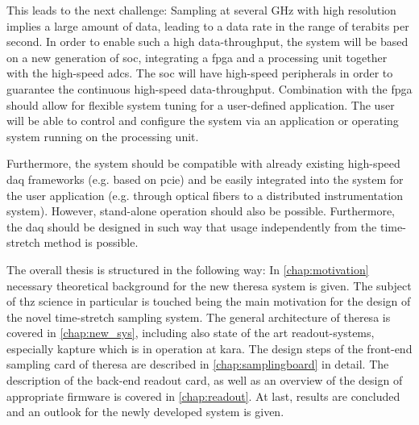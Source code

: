This leads to the next challenge: Sampling at several \si{\GHz} with high resolution implies a large amount of data, leading to a data rate in the range of terabits per second.
In order to enable such a high data-throughput, the system will be based on a new generation of \gls{soc}, integrating a \gls{fpga} and a processing unit together with the high-speed \glspl{adc}. 
The \gls{soc} will have high-speed peripherals in order to guarantee the continuous high-speed data-throughput. 
Combination with the \gls{fpga} should allow for flexible system tuning for a user-defined application.
The user will be able to control and configure the system via an application or operating system running on the processing unit.

Furthermore, the system should be compatible with already existing high-speed \gls{daq} frameworks (e.g. based on \gls{pcie}) and be easily integrated into the system for the user application (e.g. through optical fibers to a distributed instrumentation system). 
However, stand-alone operation should also be possible.
Furthermore, the \gls{daq} should be designed in such way that usage independently from the time-stretch method is possible.

The overall thesis is structured in the following way: 
In \autoref{chap:motivation} necessary theoretical background for the new \gls{theresa} system is given. 
The subject of \gls{thz} science in particular is touched being the main motivation for the design of the novel time-stretch sampling system.
The general architecture of \gls{theresa} is covered in \autoref{chap:new_sys}, including also state of the art readout-systems, especially \gls{kapture} which is in operation at \gls{kara}.
The design steps of the front-end sampling card of \gls{theresa} are described in \autoref{chap:samplingboard} in detail. 
The description of the back-end readout card, as well as an overview of the design of appropriate firmware is covered in \autoref{chap:readout}.
At last, results are concluded and an outlook for the newly developed system is given.

\glsresetall